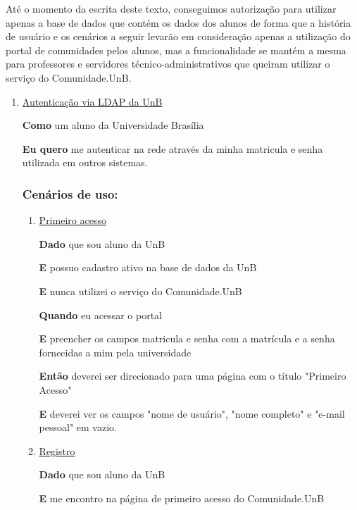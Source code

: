 Até o momento da escrita deste texto, conseguimos autorização para utilizar
apenas a base de dados que contém os dados dos alunos de forma que a
história de usuário e os cenários a seguir levarão em consideração apenas
a utilização do portal de comunidades pelos alunos, mas a funcionalidade
se mantém a mesma para professores e servidores técnico-administrativos que
queiram utilizar o serviço do Comunidade.UnB.

\begin{enumerate}

\item \underline{Autenticação via LDAP da UnB}

\textbf{Como} um aluno da Universidade Brasília

\textbf{Eu quero} me autenticar na rede através da minha matricula e senha
utilizada em outros sistemas.

\subsubsection*{Cenários de uso:}

\begin{enumerate}

\item \underline{Primeiro acesso}

\textbf{Dado} que sou aluno da UnB

\textbf{E} possuo cadastro ativo na base de dados da UnB

\textbf{E} nunca utilizei o serviço do Comunidade.UnB

\textbf{Quando} eu acessar o portal

\textbf{E} preencher os campos matricula e senha com a matrícula e a senha
fornecidas a mim pela universidade

\textbf{Então} deverei ser direcionado para uma página com o título
"Primeiro Acesso"

\textbf{E} deverei ver os campos "nome de usuário", "nome completo" e
"e-mail pessoal" em vazio.

\item \underline{Registro}

\textbf{Dado} que sou aluno da UnB

\textbf{E} me encontro na página de primeiro acesso do Comunidade.UnB


\end{enumerate}
\end{enumerate}
